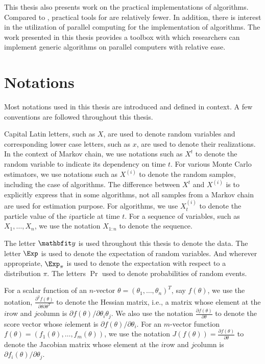 This thesis also presents work on the practical implementations of \smc algorithms. Compared to \mcmc, practical tools for \smc are relatively fewer. In addition, there is interest in the utilization of parallel computing for the implementation of \smc algorithms. The work presented in this thesis provides a toolbox with which researchers can implement generic \smc algorithms on parallel computers with relative ease.

\section{Notations}
\label{sec:Notations}

Most notations used in this thesis are introduced and defined in context. A few conventions are followed throughout this thesis.

Capital Latin letters, such as $X$, are used to denote random variables and corresponding lower case letters, such as $x$, are used to denote their realizations. In the context of Markov chain, we use notations such as $X^t$ to denote the random variable to indicate its dependency on time $t$. For various Monte Carlo estimators, we use notations such as $X^{(i)}$ to denote the random samples, including the case of \mcmc algorithms. The difference between $X^t$ and $X^{(i)}$ is to explicitly express that in some algorithms, not all samples from a Markov chain are used for estimation purpose. For \smc algorithms, we use $X_t^{(i)}$ to denote the particle value of the $i$\xth particle at time $t$. For a sequence of variables, such as $X_1,\dots,X_n$, we use the notation $X_{1:n}$ to denote the sequence.

The letter $\data$ is used throughout this thesis to denote the data. The letter $\Exp$ is used to denote the expectation of random variables. And wherever appropriate, $\Exp_{\pi}$ is used to denote the expectation with respect to a distribution $\pi$. The letters $\Pr$  used to denote probabilities of random events.

For a scalar function of an $n$-vector $\theta = (\theta_1,\dots,\theta_n)^T$, say $f(\theta)$, we use the notation, $\frac{\partial^2 f(\theta)}{\partial\theta\partial\theta^T}$ to denote the Hessian matrix, i.e., a matrix whose element at the $i$\xth row and $j$\xth column is $\partial f(\theta)/\partial\theta_i\theta_j$. We also use the notation $\frac{\partial f(\theta)}{\partial\theta}$ to denote the score vector whose $i$\xth element is $\partial f(\theta)/\partial\theta_i$. For an $m$-vector function $f(\theta) = (f_1(\theta),\dots,f_m(\theta))$, we use the notation $J(f(\theta)) = \frac{\partial f(\theta)}{\partial\theta}$ to denote the Jacobian matrix whose element at the $i$\xth row and $j$\xth column is $\partial f_i(\theta)/\partial\theta_j$.

